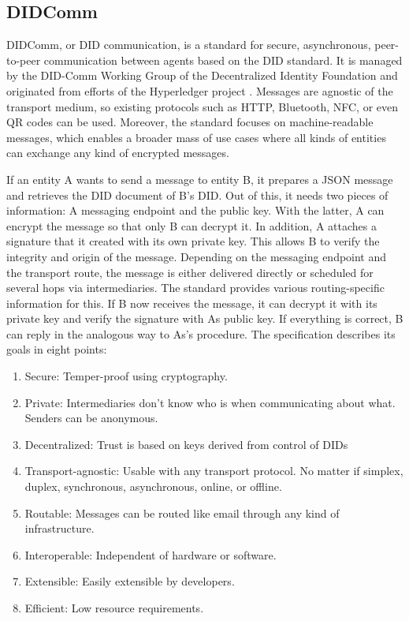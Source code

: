 		\subsection{DIDComm}
		
		DIDComm, or DID communication, is a standard for secure, asynchronous, peer-to-peer communication between agents based on the DID standard. It is managed by the DID-Comm Working Group of the Decentralized Identity Foundation \cite{hardman_didcomm_2021} and originated from efforts of the Hyperledger project \cite{hardman_aries_2019}. Messages are agnostic of the transport medium, so existing protocols such as HTTP, Bluetooth, NFC, or even QR codes can be used.  Moreover, the standard focuses on machine-readable messages, which enables a broader mass of use cases where all kinds of entities can exchange any kind of encrypted messages. \cite[pp. 96-97]{preukschat_self-sovereign_2021}
		
		If an entity A wants to send a message to entity B, it prepares a JSON message and retrieves the DID document of B's DID. Out of this, it needs two pieces of information: A messaging endpoint and the public key. With the latter, A can encrypt the message so that only B can decrypt it. In addition, A attaches a signature that it created with its own private key. This allows B to verify the integrity and origin of the message. Depending on the messaging endpoint and the transport route, the message is either delivered directly or scheduled for several hops via intermediaries. The standard provides various routing-specific information for this. If B now receives the message, it can decrypt it with its private key and verify the signature with As public key. If everything is correct, B can reply in the analogous way to As's procedure. The specification describes its goals in eight points: \cite{hardman_didcomm_2021}
		
		\begin{enumerate}
		    \item Secure: Temper-proof using cryptography.
		    \item Private: Intermediaries don't know who is when communicating about what. Senders can be anonymous.
		    \item Decentralized: Trust is based on keys derived from control of \acp{DID}
		    \item Transport-agnostic: Usable with any transport protocol. No matter if simplex, duplex, synchronous, asynchronous, online, or offline.
		    \item Routable: Messages can be routed like email through any kind of infrastructure.
		    \item Interoperable: Independent of hardware or software.
		    \item Extensible: Easily extensible by developers.
		    \item Efficient: Low resource requirements.
		\end{enumerate}
		
